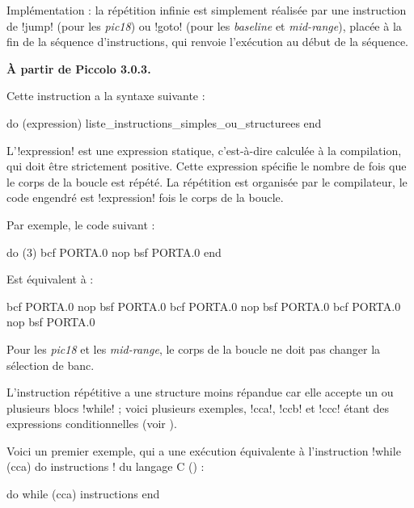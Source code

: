 Implémentation : la répétition infinie est simplement réalisée par une instruction de \pic!jump! (pour les \emph{pic18}) ou \pic!goto! (pour les \emph{baseline} et \emph{mid-range}), placée à la fin de la séquence d'instructions, qui renvoie l'exécution au début de la séquence.






\textbf{À partir de Piccolo 3.0.3.}


Cette instruction a la syntaxe suivante :
\begin{piccolo}
do (expression)
  liste_instructions_simples_ou_structurees
end
\end{piccolo}

L'\pic!expression! est une expression statique, c'est-à-dire calculée à la compilation, qui doit être strictement positive. Cette expression spécifie le nombre de fois que le corps de la boucle est répété. La répétition est organisée par le compilateur, le code engendré est \pic!expression! fois le corps de la boucle.

Par exemple, le code suivant :
\begin{piccolo}
do (3)
  bcf PORTA.0
  nop
  bsf PORTA.0
end
\end{piccolo}

Est équivalent à :
\begin{piccolo}
bcf PORTA.0
nop
bsf PORTA.0
bcf PORTA.0
nop
bsf PORTA.0
bcf PORTA.0
nop
bsf PORTA.0
\end{piccolo}


Pour les \emph{pic18} et les \emph{mid-range}, le corps de la boucle ne doit pas changer la sélection de banc.










L'instruction répétitive a une structure moins répandue car elle accepte un ou plusieurs blocs \pic!while! ; voici plusieurs exemples, \pic!cca!, \pic!ccb! et \pic!ccc! étant des expressions conditionnelles (voir ).


Voici un premier exemple, qui a une exécution équivalente à l'instruction \pic!while (cca) do { instructions }! du langage C () :
\begin{piccolo}
do
while (cca)
  instructions
end
\end{piccolo}

